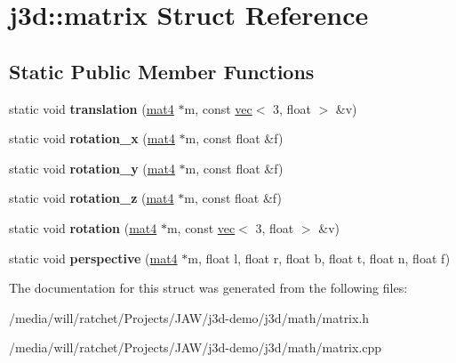 \hypertarget{structj3d_1_1matrix}{}\section{j3d\+:\+:matrix Struct Reference}
\label{structj3d_1_1matrix}
\subsection*{Static Public Member Functions}
\begin{DoxyCompactItemize}
\item 
\hypertarget{structj3d_1_1matrix_ac24b3a1ccdf5685b76e35e3983155553}{}static void {\bfseries translation} (\hyperlink{structj3d_1_1mat4}{mat4} $\ast$m, const \hyperlink{structj3d_1_1vec}{vec}$<$ 3, float $>$ \&v)\label{structj3d_1_1matrix_ac24b3a1ccdf5685b76e35e3983155553}

\item 
\hypertarget{structj3d_1_1matrix_a3bcefb1f8e597ed864c10ddc362e053d}{}static void {\bfseries rotation\+\_\+x} (\hyperlink{structj3d_1_1mat4}{mat4} $\ast$m, const float \&f)\label{structj3d_1_1matrix_a3bcefb1f8e597ed864c10ddc362e053d}

\item 
\hypertarget{structj3d_1_1matrix_a697383b57468099867f18be52229e9a5}{}static void {\bfseries rotation\+\_\+y} (\hyperlink{structj3d_1_1mat4}{mat4} $\ast$m, const float \&f)\label{structj3d_1_1matrix_a697383b57468099867f18be52229e9a5}

\item 
\hypertarget{structj3d_1_1matrix_a1865b6ce825c48f4b095eab6d4b6f669}{}static void {\bfseries rotation\+\_\+z} (\hyperlink{structj3d_1_1mat4}{mat4} $\ast$m, const float \&f)\label{structj3d_1_1matrix_a1865b6ce825c48f4b095eab6d4b6f669}

\item 
\hypertarget{structj3d_1_1matrix_a3ca34a730865f7072bfb8c763452c9cb}{}static void {\bfseries rotation} (\hyperlink{structj3d_1_1mat4}{mat4} $\ast$m, const \hyperlink{structj3d_1_1vec}{vec}$<$ 3, float $>$ \&v)\label{structj3d_1_1matrix_a3ca34a730865f7072bfb8c763452c9cb}

\item 
\hypertarget{structj3d_1_1matrix_a6474eafe5b54e5d9781a578098ced664}{}static void {\bfseries perspective} (\hyperlink{structj3d_1_1mat4}{mat4} $\ast$m, float l, float r, float b, float t, float n, float f)\label{structj3d_1_1matrix_a6474eafe5b54e5d9781a578098ced664}

\end{DoxyCompactItemize}


The documentation for this struct was generated from the following files\+:\begin{DoxyCompactItemize}
\item 
/media/will/ratchet/\+Projects/\+J\+A\+W/j3d-\/demo/j3d/math/matrix.\+h\item 
/media/will/ratchet/\+Projects/\+J\+A\+W/j3d-\/demo/j3d/math/matrix.\+cpp\end{DoxyCompactItemize}
